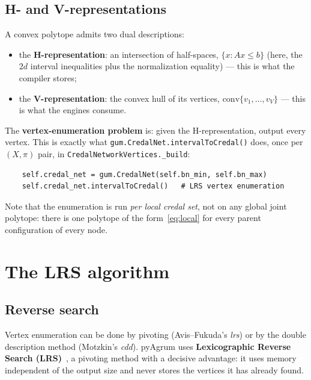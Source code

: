 \documentclass[11pt]{article}
\begin{document}
\subsection{H- and V-representations}

A convex polytope admits two dual descriptions:
\begin{itemize}
  \item the \textbf{H-representation}: an intersection of half-spaces,
    $\{x : Ax \le b\}$ (here, the $2d$ interval inequalities plus the normalization
    equality) --- this is what the compiler stores;
  \item the \textbf{V-representation}: the convex hull of its vertices,
    $\mathrm{conv}\{v_1, \dots, v_V\}$ --- this is what the engines consume.
\end{itemize}
The \textbf{vertex-enumeration problem} is: given the H-representation, output every
vertex. This is exactly what \texttt{gum.CredalNet.intervalToCredal()} does, once per
$(X, \pi)$ pair, in \texttt{CredalNetworkVertices.\_build}:
\begin{verbatim}
    self.credal_net = gum.CredalNet(self.bn_min, self.bn_max)
    self.credal_net.intervalToCredal()   # LRS vertex enumeration
\end{verbatim}
Note that the enumeration is run \emph{per local credal set}, not on any global joint
polytope: there is one polytope of the form~\eqref{eq:local} for every parent
configuration of every node.

\section{The LRS algorithm}

\subsection{Reverse search}

Vertex enumeration can be done by pivoting (Avis--Fukuda's \emph{lrs}) or by the double
description method (Motzkin's \emph{cdd}). pyAgrum uses \textbf{Lexicographic Reverse
Search (LRS)}~\cite{avisfukuda}, a pivoting method with a decisive advantage: it uses
memory independent of the output size and never stores the vertices it has already found.
\end{document}
